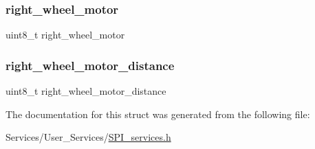\subsubsection{\texorpdfstring{right\+\_\+wheel\+\_\+motor}{right\_wheel\_motor}}
{\footnotesize\ttfamily uint8\+\_\+t right\+\_\+wheel\+\_\+motor}

\mbox{\label{struct_octets_frame___typedef_ac68f226c7529335c37f27cd95aedff32}} 
\subsubsection{\texorpdfstring{right\+\_\+wheel\+\_\+motor\+\_\+distance}{right\_wheel\_motor\_distance}}
{\footnotesize\ttfamily uint8\+\_\+t right\+\_\+wheel\+\_\+motor\+\_\+distance}



The documentation for this struct was generated from the following file\+:\begin{DoxyCompactItemize}
\item 
Services/\+User\+\_\+\+Services/\hyperlink{_s_p_i__services_8h}{S\+P\+I\+\_\+services.\+h}\end{DoxyCompactItemize}
